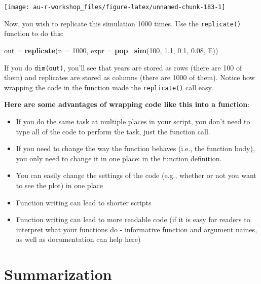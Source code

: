 \documentclass[]{book}
\newenvironment{Shaded}{\begin{snugshade}}{\end{snugshade}}
\newcommand{\DataTypeTok}[1]{\textcolor[rgb]{0.13,0.29,0.53}{#1}}
\newcommand{\DecValTok}[1]{\textcolor[rgb]{0.00,0.00,0.81}{#1}}
\newcommand{\FloatTok}[1]{\textcolor[rgb]{0.00,0.00,0.81}{#1}}
\newcommand{\KeywordTok}[1]{\textcolor[rgb]{0.13,0.29,0.53}{\textbf{#1}}}
\newcommand{\NormalTok}[1]{#1}
\newcommand{\StringTok}[1]{\textcolor[rgb]{0.31,0.60,0.02}{#1}}
\providecommand{\tightlist}{%
  \setlength{\itemsep}{0pt}\setlength{\parskip}{0pt}}
\begin{document}
\begin{center}\texttt{[image: au-r-workshop\_files/figure-latex/unnamed-chunk-183-1]} \end{center}

Now, you wish to replicate this simulation 1000 times. Use the \texttt{replicate()} function to do this:

\begin{Shaded}
\begin{Highlighting}[]
\NormalTok{out =}\StringTok{ }\KeywordTok{replicate}\NormalTok{(}\DataTypeTok{n =} \DecValTok{1000}\NormalTok{, }\DataTypeTok{expr =} \KeywordTok{pop_sim}\NormalTok{(}\DecValTok{100}\NormalTok{, }\FloatTok{1.1}\NormalTok{, }\FloatTok{0.1}\NormalTok{, }\FloatTok{0.08}\NormalTok{, F))}
\end{Highlighting}
\end{Shaded}

If you do \texttt{dim(out)}, you'll see that years are stored as rows (there are 100 of them) and replicates are stored as columns (there are 1000 of them). Notice how wrapping the code in the function made the \texttt{replicate()} call easy.

\textbf{Here are some advantages of wrapping code like this into a function}:

\begin{itemize}
\tightlist
\item
  If you do the same task at multiple places in your script, you don't need to type all of the code to perform the task, just the function call.
\item
  If you need to change the way the function behaves (i.e., the function body), you only need to change it in one place: in the function definition.
\item
  You can easily change the settings of the code (e.g., whether or not you want to see the plot) in one place
\item
  Function writing can lead to shorter scripts
\item
  Function writing can lead to more readable code (if it is easy for readers to interpret what your functions do - informative function and argument names, as well as documentation can help here)
\end{itemize}

\hypertarget{mc-summaries}{%
\section{Summarization}\label{mc-summaries}}
\end{document}
